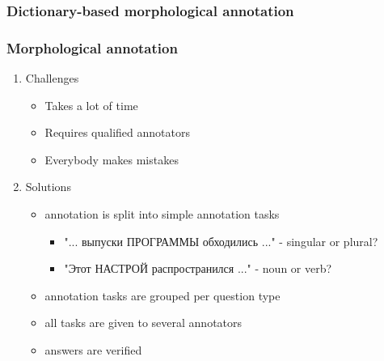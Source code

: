 \documentclass{beamer}
\begin{document}
\begin{frame}
\frametitle{Dictionary-based morphological annotation}
\begin{figure}
\end{figure}
\end{frame}


\begin{frame}
\frametitle{Morphological annotation}
\begin{enumerate}
\item{Challenges}
    \begin{itemize}
    \item{Takes a lot of time}
    \item{Requires qualified annotators}
    \item{Everybody makes mistakes}
    \end{itemize}
    \pause
\item{Solutions}
    \begin{itemize}
    \item{annotation is split into simple annotation tasks}
        \begin{itemize}
        \item{"... выпуски ПРОГРАММЫ обходились ..." - singular or plural?}
        \item{"Этот НАСТРОЙ распространился ..." - noun or verb?}
        \end{itemize}
    \item{annotation tasks are grouped per question type}
    \item{all tasks are given to several annotators}
    \item{answers are verified}
    \end{itemize}
\end{enumerate}
\end{frame}
\end{document}
